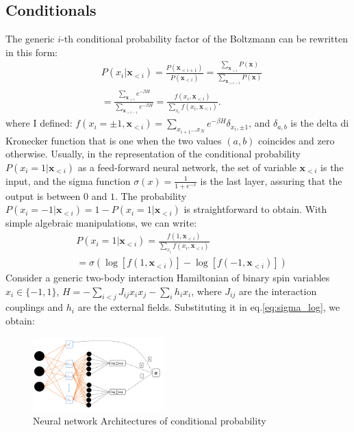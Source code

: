 \documentclass[aps,physrev,10pt,floatfix,reprint]{revtex4-2}
\begin{document}
\subsection{Conditionals}
The generic $i$-th conditional probability factor of the Boltzmann can be rewritten in this form: 
\begin{equation}
    \label{eq:chain}
    \begin{split}
    & P\left(x_{i}|\mathbf{x}_{<i}\right)  = 
    \frac{P\left(\mathbf{x}_{<i+1}\right)}{P\left(\mathbf{x}_{<i}\right)}  = 
    \frac{\sum_{\mathbf{x}_{>i}}P\left(\mathbf{x}\right)}{\sum_{\mathbf{x}_{>i-1}}P\left(\mathbf{x}\right)} \\
    &=\frac{\sum_{\mathbf{x}_{>i}}e^{-\beta H}}{\sum_{\mathbf{x}_{>i-1}}e^{-\beta H}}  = 
    \frac{f\left(x_{i},\mathbf{x}_{<i}\right)}{\sum_{x_{i}}f\left(x_{i},\mathbf{x}_{<i}\right)}.
    \end{split}
\end{equation}
where I defined: $f\left(x_{i}=\pm 1,\mathbf{x}_{<i}\right) = \sum_{x_{i+1}\dots x_{N}}e^{-\beta H}\delta_{x_i, \pm1}$, and $\delta_{a,b}$ is the delta di Kronecker function that is one when the two values $(a,b)$ coincides and zero otherwise. Usually, in the representation of the conditional probability $P\left(x_{i}=1|\mathbf{x}_{<i}\right)$ as a feed-forward neural network, the set of variable $\mathbf{x}_{<i}$ is the input, and the sigma function $\sigma(x)=\frac{1}{1+e^{-x}}$ is the last layer, assuring that the output is between $0$ and $1$. The probability $P\left(x_{i}=-1|\mathbf{x}_{<i}\right) = 1 - P\left(x_{i}=1|\mathbf{x}_{<i}\right)$ is straightforward to obtain. With simple algebraic manipulations, we can write: 
\begin{equation}
    \label{eq:sigma_log}
    \begin{split}
    & P\left(x_{i}=1|\mathbf{x}_{<i}\right) = \frac{f\left(1,\mathbf{x}_{<i}\right)}{\sum_{x_{i}}f\left(x_{i},\mathbf{x}_{<i}\right)}\\
    &= \sigma\left(\log\left[f\left(1,\mathbf{x}_{<i}\right)\right]-\log\left[f\left(-1,\mathbf{x}_{<i}\right)\right]\right)
    \end{split}
\end{equation}
Consider a generic two-body interaction Hamiltonian of binary spin variables $x_i \in \{-1,1\}$, $H = -\sum_{i<j} J_{ij} x_i x_j - \sum_{i} h_i x_i$, where $J_{ij}$ are the interaction couplings and $h_i$ are the external fields. Substituting it in eq.\ref{eq:sigma_log}, we obtain:
\begin{figure}[!ht]
    \includegraphics[width=0.45\textwidth]{img/twoboghann.pdf}
    \caption{Neural network Architectures of conditional probability}
    \label{fig:arch}
\end{figure}
\end{document}
